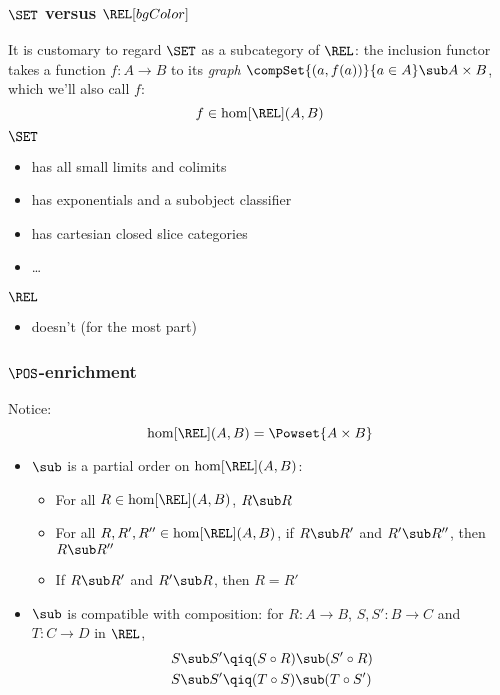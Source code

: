 {    \begin{frame}
        \frametitle{$\SET$ versus $\REL[bgColor]$}
        It is customary to regard $\SET$ as a subcategory of $\REL$: \pause the inclusion functor takes a function $f:A\to B$ to its \textit{graph} $\compSet{(a,f(a))}{a\in A} \sub A\times B$, \pause which we'll also call $f$:
            \[ f \in \hom[\REL](A,B) \]\pause
        $\SET$
        {\normalsize \begin{itemize}
            \item has all small limits and colimits
            \item has exponentials and a subobject classifier
            \item has cartesian closed slice categories
            \item \ldots
        \end{itemize}\pause}
        $\REL$
        {\normalsize \begin{itemize}
            \item doesn't (for the most part)
        \end{itemize}}
    \end{frame}

    \begin{frame}
        \frametitle{$\POS$-enrichment}
        Notice:
            \[ \hom[\REL](A,B) = \Powset{A\times B} \]\pause

        \begin{itemize}
            \item $\sub$ is a partial order on $\hom[\REL](A,B)$:\pause
                {\normalsize \begin{itemize}
                    \item For all $R\in\hom[\REL](A,B)$, $R\sub R$
                    \item For all $R,R',R''\in\hom[\REL](A,B)$, if $R\sub R'$ and $R'\sub R''$, then $R\sub R''$
                    \item If $R\sub R'$ and $R'\sub R$, then $R=R'$
                \end{itemize}}\pause
            \item $\sub$ is compatible with composition: \pause for $R:A\to B$, $S,S':B\to C$ and $T:C\to D$ in $\REL$,
                \begin{align*}
                    S\sub S' &\qiq (S\circ R)\sub (S'\circ R)\\
                    S\sub S' &\qiq (T\circ S)\sub (T\circ S')
                \end{align*}
        \end{itemize}
    \end{frame}

}
